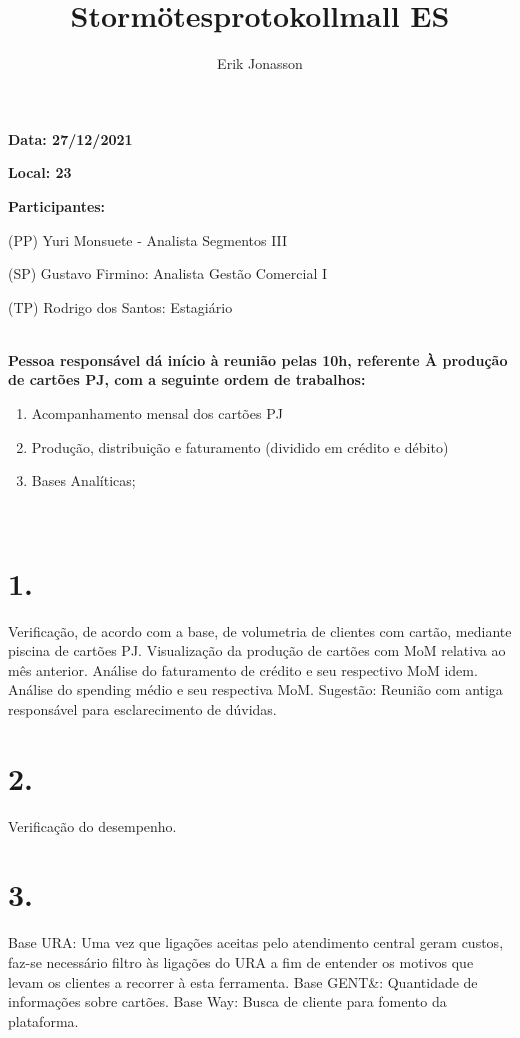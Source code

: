 \documentclass[a4paper, 11pt]{article}
\title{Stormötesprotokollmall ES}
\author{Erik Jonasson}
\begin{document}
\pagestyle{style1}

\textbf{Data: 27/12/2021} %

\textbf{Local: 23} %

\textbf{Participantes:} 
\begin{description}
\item (PP) Yuri Monsuete - Analista Segmentos III
\item (SP) Gustavo Firmino: Analista Gestão Comercial I
\item (TP) Rodrigo dos Santos: Estagiário
\end{description}

\makebox[\linewidth]{\rule{\linewidth}{0.4pt}}\\
\textbf{Pessoa responsável dá início à reunião pelas 10h, referente À produção de cartões PJ, com a seguinte ordem de trabalhos:} 
\begin{enumerate}
\item Acompanhamento mensal dos cartões PJ


\item Produção, distribuição e faturamento (dividido em crédito e débito)
\item Bases Analíticas;




\end{enumerate}
\makebox[\linewidth]{\rule{\linewidth}{0.4pt}}\\

\section*{1.}
Verificação, de acordo com a base, de volumetria de clientes com cartão, mediante piscina de cartões PJ. Visualização da produção de cartões com MoM relativa ao mês anterior. Análise  do faturamento de crédito e seu respectivo MoM idem. Análise do spending médio e seu respectiva MoM.
Sugestão: Reunião com antiga responsável para esclarecimento de dúvidas.


\section*{2. }
Verificação do desempenho.

\section*{3.}
Base URA: Uma vez que ligações aceitas pelo atendimento central geram custos, faz-se necessário filtro às ligações do URA a fim de entender os motivos que levam os clientes a recorrer à esta ferramenta. 
Base GENT&: Quantidade de informações sobre cartões.
Base Way: Busca de cliente para fomento da plataforma.
 
\end{document}
